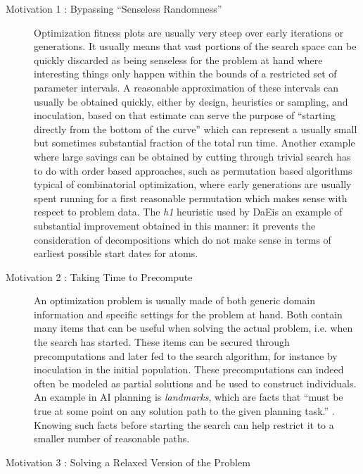 \documentclass[english]{DESCARWINreport}
\newcommand{\DAE}{{\sc DaE}}
\begin{document}
\begin{description}

\item[Motivation 1 : Bypassing "`Senseless Randomness"'] 

Optimization fitness plots are usually very steep over early iterations or generations. It usually means that vast portions of the search space can be quickly discarded as being senseless for the problem at hand where interesting things only happen within the bounds of a restricted set of parameter intervals. A reasonable approximation of these intervals can usually be obtained quickly, either by design, heuristics or sampling, and inoculation, based on that estimate can serve the purpose of "`starting directly from the bottom of the curve"' which can represent a usually small but sometimes substantial fraction of the total run time. Another example where large savings can be obtained by cutting through trivial search has to do with order based approaches, such as permutation based algorithms typical of combinatorial optimization, where early generations are usually spent running for a first reasonable permutation which makes sense with respect to problem data. The \emph{h1} heuristic used by \DAE is an example of substantial improvement obtained in this manner: it prevents the consideration of decompositions which do not make sense in terms of earliest possible start dates for atoms.

\item[Motivation 2 : Taking Time to Precompute]

An optimization problem is usually made of both generic domain information and specific settings for the problem at hand. Both contain many items that can be useful when solving the actual problem, i.e. when the search has started. These items can be secured through precomputations and later fed to the search algorithm, for instance by inoculation in the initial population. These precomputations can indeed often be modeled as partial solutions and be used to construct individuals. An example in AI planning is \emph{landmarks}, which are facts that "`must be true at some point on any solution path to the given planning task."' \cite{DBLP:journals/corr/abs-1107-0052}. Knowing such facts before starting the search can help restrict it to a smaller number of reasonable paths.

\item[Motivation 3 : Solving a Relaxed Version of the Problem]


\end{description}
\end{document}
